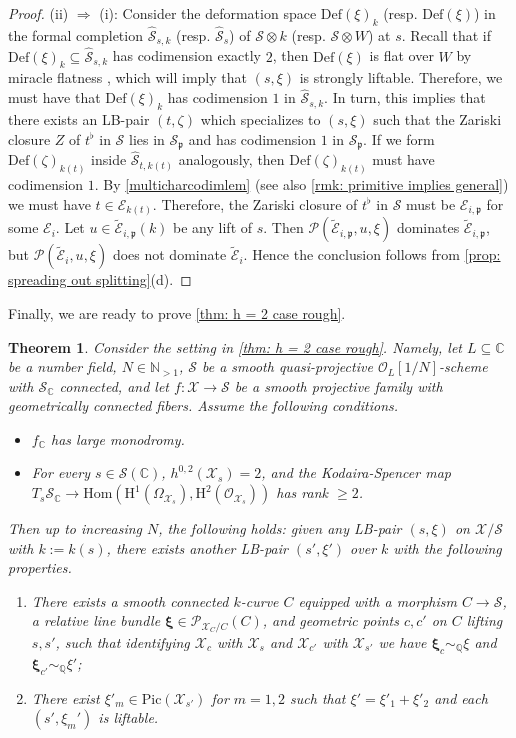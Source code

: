 \documentclass[letter, 11pt]{article}
\theoremstyle{plain}
\newtheorem{theorem}[subsubsection]{Theorem}
\theoremstyle{definition}
\newcommand{\IC}{\mathbb{C}}
\newcommand{\IN}{\mathbb{N}}
\newcommand{\IQ}{\mathbb{Q}}
\newcommand{\Hom}{\mathrm{Hom}}
\newcommand\tensor{{\otimes}}
\newcommand{\<}{\langle}
\renewcommand{\>}{\rangle}
\def\wt{\widetilde}
\newcommand{\fp}{\mathfrak{p}}
\newcommand{\sX}{\mathcal{X}}
\newcommand{\sS}{\mathcal{S}}
\newcommand{\sE}{\mathcal{E}}
\newcommand{\sO}{\mathcal{O}}
\newcommand{\Pic}{\mathrm{Pic}}
\renewcommand{\H}{\mathrm{H}}
\newcommand{\shP}{\mathscr{P}}
\newcommand{\Def}{\mathrm{Def}}
\newcommand{\bxi}{\boldsymbol{\xi}}
\begin{document}
\begin{proof}
    (ii) $\Rightarrow$ (i): Consider the deformation space $\Def(\xi)_k$ (resp. $\Def(\xi)$) in the formal completion $\hat{\sS}_{s, k}$ (resp. $\hat{\sS}_s$) of $\sS \tensor k$ (resp. $\sS \tensor W$) at $s$. Recall that if $\Def(\xi)_k \subseteq \hat{\sS}_{s, k}$ has codimension exactly $2$, then $\Def(\xi)$ is flat over $W$ by miracle flatness \cite[00R4]{stacks-project}, which will imply that $(s, \xi)$ is strongly liftable. Therefore, we must have that $\Def(\xi)_k$ has codimension $1$ in $\hat{\sS}_{s, k}$. In turn, this implies that there exists an LB-pair $(t, \zeta)$ which specializes to $(s, \xi)$ such that the Zariski closure $Z$ of $t^\flat$ in $\sS$ lies in $\sS_\fp$ and has codimension $1$ in $\sS_\fp$. If we form $\Def(\zeta)_{k(t)}$ inside $\hat{\sS}_{t, k(t)}$ analogously, then $\Def(\zeta)_{k(t)}$ must have codimension $1$. By \ref{multicharcodimlem} (see also \ref{rmk: primitive implies general}) we must have $t \in \sE_{k(t)}$. Therefore, the Zariski closure of $t^\flat$ in $\sS$ must be $\sE_{i, \fp}$ for some $\sE_i$. Let $u \in \wt{\sE}_{i, \fp}(k)$ be any lift of $s$. Then $\shP(\wt{\sE}_{i, \fp}, u, \xi)$ dominates $\wt{\sE}_{i, \fp}$, but $\shP(\wt{\sE}_i, u, \xi)$ does not dominate $\wt{\sE}_i$. Hence the conclusion follows from \ref{prop: spreading out splitting}(d). 
\end{proof}

Finally, we are ready to prove \ref{thm: h = 2 case rough}.
\begin{theorem}
\label{thm: h = 2 case}
Consider the setting in \ref{thm: h = 2 case rough}. Namely, let $L \subseteq \IC$ be a number field, $N \in \IN_{> 1}$, $\sS$ be a smooth quasi-projective $\sO_L[1/N]$-scheme with $\sS_\IC$ connected, and let $f : \sX \to \sS$ be a smooth projective family with geometrically connected fibers. Assume the following conditions. 
\begin{itemize}
    \item $f_\IC$ has large monodromy. 
    \item For every $s \in \sS(\IC)$, $h^{0, 2}(\sX_s) = 2$, and the Kodaira-Spencer map $T_s \sS_\IC \to \Hom(\H^1(\Omega_{\sX_s}), \H^2(\sO_{\sX_s}))$ has rank $\ge 2$. 
\end{itemize}
Then up to increasing $N$, the following holds: given any LB-pair $(s, \xi)$ on $\sX/\sS$ with $k := k(s)$, there exists another LB-pair $(s', \xi')$ over $k$ with the following properties. 
    \begin{enumerate}[label=\upshape{(\roman*)}]
        \item There exists a smooth connected $k$-curve $C$ equipped with a morphism $C \to \sS$, a relative line bundle $\bxi \in \shP_{\sX_C/C}(C)$, and geometric points $c, c'$ on $C$ lifting $s, s'$, such that identifying $\sX_{c}$ with $\sX_{s}$ and $\sX_{c'}$ with $\sX_{s'}$ we have $\bxi_c \sim_\IQ \xi$ and $\bxi_{c'} \sim_\IQ \xi'$; 
        \item There exist $\xi'_m \in \Pic(\sX_{s'})$ for $m = 1, 2$ such that $\xi' = \xi'_1 + \xi'_2$ and each $(s', \xi_m')$ is liftable. 
    \end{enumerate}
\end{theorem}
\end{document}

